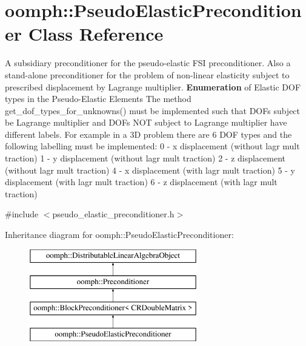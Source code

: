 \hypertarget{classoomph_1_1PseudoElasticPreconditioner}{}\section{oomph\+:\+:Pseudo\+Elastic\+Preconditioner Class Reference}
\label{classoomph_1_1PseudoElasticPreconditioner}


A subsidiary preconditioner for the pseudo-\/elastic F\+SI preconditioner. Also a stand-\/alone preconditioner for the problem of non-\/linear elasticity subject to prescribed displacement by Lagrange multiplier. {\bfseries Enumeration} of Elastic D\+OF types in the Pseudo-\/\+Elastic Elements The method get\+\_\+dof\+\_\+types\+\_\+for\+\_\+unknowns() must be implemented such that D\+O\+Fs subject be Lagrange multiplier and D\+O\+Fs N\+OT subject to Lagrange multiplier have different labels. For example in a 3D problem there are 6 D\+OF types and the following labelling must be implemented\+: 0 -\/ x displacement (without lagr mult traction) 1 -\/ y displacement (without lagr mult traction) 2 -\/ z displacement (without lagr mult traction) 4 -\/ x displacement (with lagr mult traction) 5 -\/ y displacement (with lagr mult traction) 6 -\/ z displacement (with lagr mult traction)  




{\ttfamily \#include $<$pseudo\+\_\+elastic\+\_\+preconditioner.\+h$>$}

Inheritance diagram for oomph\+:\+:Pseudo\+Elastic\+Preconditioner\+:\begin{figure}[H]
\begin{center}
\leavevmode
\includegraphics[height=4.000000cm]{classoomph_1_1PseudoElasticPreconditioner}
\end{center}
\end{figure}

